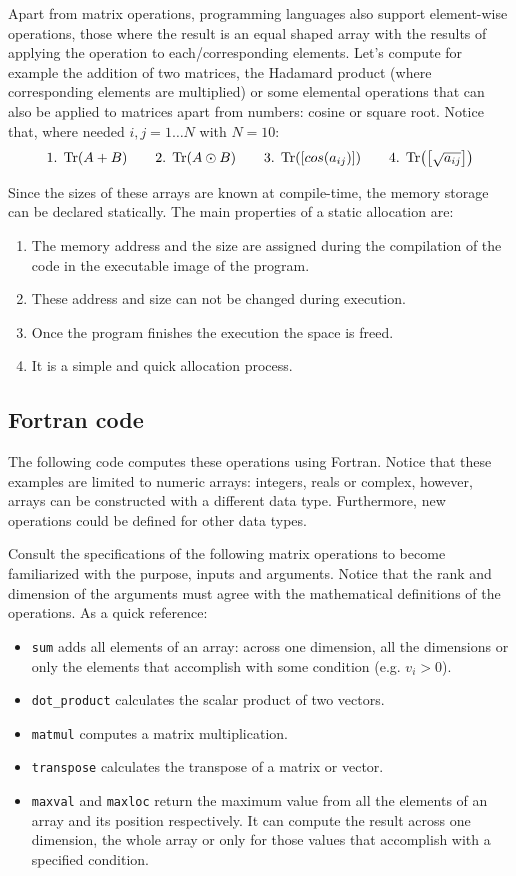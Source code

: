 Apart from matrix operations, programming languages also support element-wise operations,
those where the result is an equal shaped array with the results of applying the operation to each/corresponding elements.
Let's compute for example the addition of two matrices, the Hadamard product (where corresponding elements are multiplied)
or some elemental operations that can also be applied to matrices apart from numbers: cosine or square root. 
Notice that, where needed $i,j = 1\ldots N$ with $N=10$:
$$
1.\;\Tr(A + B)  \quad \quad 2.\;\Tr(A\odot B)  \quad \quad   3.\;\Tr( \left[ cos( a_{ij} )\right] )   \quad \quad 4.\;\Tr( \left[ \sqrt{a_{ij}} \right] )
$$

Since the sizes of these arrays are known at compile-time, the memory storage can be declared statically. 
The main properties of a static allocation are:
\begin{enumerate}
    \item The memory address and the size are assigned during the compilation of the code in the executable image of the program.
    \item These address and size can not be changed during execution.
    \item Once the program finishes the execution the space is freed.
    \item It is a simple and quick allocation process.
\end{enumerate}



        \newpage
        \subsection*{Fortran code}
The following code computes these operations using Fortran. 
Notice that these examples are limited to numeric arrays: integers, reals or complex,
however, arrays can be constructed with a different data type. 
Furthermore, new operations could be defined for other data types. 
    
Consult the specifications of the following matrix operations to become familiarized with the purpose, inputs and arguments.
Notice that the rank and dimension of the arguments must agree with the mathematical definitions of the operations.
As a quick reference: 
\begin{itemize}[noitemsep]
    \item \texttt{sum} adds all elements of an array: across one dimension, all the dimensions 
    or only the elements that accomplish with some condition (e.g. $v_i > 0$).
    \item \texttt{dot\_product} calculates the scalar product of two vectors.
    \item \texttt{matmul} computes a matrix multiplication. 
    \item \texttt{transpose} calculates the transpose of a matrix or vector. 
    \item \texttt{maxval} and \texttt{maxloc} return the maximum value from all the elements of an array and its position respectively.
    It can compute the result across one dimension, the whole array or only for those values that accomplish with a specified condition.
\end{itemize}

